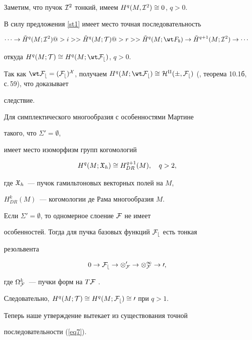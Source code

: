 \begin{pf}


Заметим, что пучок ${\cal I}^2$ тонкий, имеем $H^q(M,{\cal I}^2)\cong 0$, $q > 0$.


В силу предложения \ref{st1} имеет место точная последовательность


$$


\dotsb \to


\check H^q(M;\cI^2) @>{i}>>


\check H^q(M;\cT) @>{r}>>


\check H^q(M;\wt F_b) \to


\check H^{q+1}(M;\cI^2) \to


\dotsb


$$


откуда $H^q(M;\cT) \cong H^q(M;\wt\cF_b)$, $q> 0$.


Так как $\wt\cF_b = (\cF_b)^X$, получаем $H^q(M;\wt\cF_b) \cong


H^q(\Sigma,\cF_b)$ (\cite{Bre}, теорема 10.1б, с.\,59), что доказывает


следствие.


\end{pf}








\begin{cor} Для симплектического многообразия с особенностями Мартине


такого, что $\Sigma'=\emptyset$,


имеет место изоморфизм групп когомологий


$$


H^q(M;\gX_h) \cong H^{q+1}_{DR}(M), \quad q>2,


$$


где ${\frak X}_h$~--- пучок гамильтоновых векторных полей на $M$,


$H^k_{DR}(M)$~--- когомологии де Рама многообразия $M$.


\end{cor}





\begin{pf}


Если $\Sigma'=\emptyset$, то одномерное слоение $\cal F$ не имеет


особенностей. Тогда для пучка базовых функций $\cal F_b$ есть тонкая


резольвента


$$


0 \to \cF_b \to \Omega^0_{\cF} \to \Omega^1_{\cF} \to 0,


$$


где $\Omega^k_{\cal F}$~--- пучки форм на $T\cal F$ \cite{Vais}.


Следовательно, $H^q(M;{\cal T}) \cong H^q(M;\cal F_b) \cong 0$ при $q > 1$.


Теперь наше утверждение вытекает из существования точной


последовательности (\ref{eq7}).


\end{pf}









